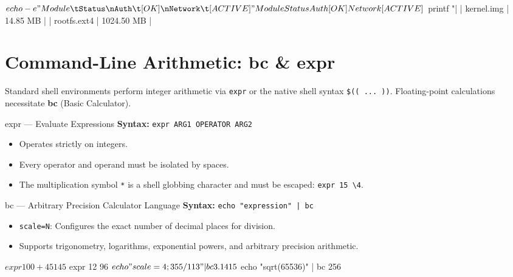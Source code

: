 \begin{terminalbox}
$ echo -e "Module\tStatus\nAuth\t[OK]\nNetwork\t[ACTIVE]"
Module  Status
Auth    [OK]
Network [ACTIVE]

$ printf "| %
| kernel.img   |    14.85 MB |
| rootfs.ext4  |  1024.50 MB |
\end{terminalbox}

\section{Command-Line Arithmetic: bc \& expr}
Standard shell environments perform integer arithmetic via \texttt{expr} or the native shell syntax \texttt{\$(( ... ))}. Floating-point calculations necessitate \textbf{bc} (Basic Calculator).

\begin{commandbox}{expr --- Evaluate Expressions}
\textbf{Syntax:} \texttt{expr ARG1 OPERATOR ARG2}
\begin{itemize}[leftmargin=1.5em]
    \item Operates strictly on integers.
    \item Every operator and operand must be isolated by spaces.
    \item The multiplication symbol \texttt{*} is a shell globbing character and must be escaped: \texttt{expr 15 \textbackslash* 4}.
\end{itemize}
\end{commandbox}

\begin{commandbox}{bc --- Arbitrary Precision Calculator Language}
\textbf{Syntax:} \texttt{echo "expression" | bc}
\begin{itemize}[leftmargin=1.5em]
    \item \texttt{scale=N}: Configures the exact number of decimal places for division.
    \item Supports trigonometry, logarithms, exponential powers, and arbitrary precision arithmetic.
\end{itemize}
\end{commandbox}

\begin{terminalbox}
$ expr 100 + 45
145
$ expr 12 
96
$ echo "scale=4; 355 / 113" | bc
3.1415
$ echo "sqrt(65536)" | bc
256
\end{terminalbox}

